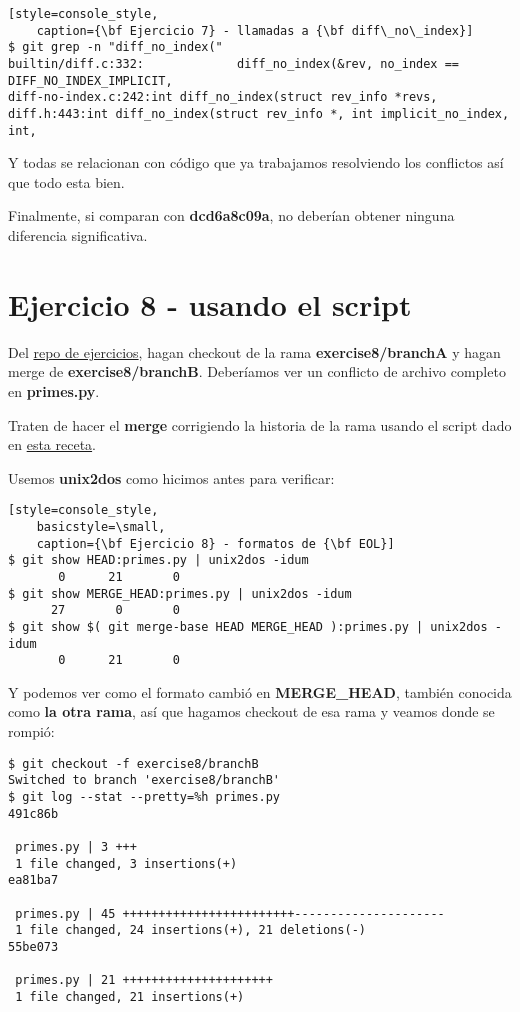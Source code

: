 \begin{lstlisting}[style=console_style,
	caption={\bf Ejercicio 7} - llamadas a {\bf diff\_no\_index}]
$ git grep -n "diff_no_index("
builtin/diff.c:332:             diff_no_index(&rev, no_index == DIFF_NO_INDEX_IMPLICIT, 
diff-no-index.c:242:int diff_no_index(struct rev_info *revs,
diff.h:443:int diff_no_index(struct rev_info *, int implicit_no_index, int,
\end{lstlisting}

Y todas se relacionan con código que ya trabajamos resolviendo los conflictos así que todo esta bien.

Finalmente, si comparan con {\bf dcd6a8c09a}, no deberían obtener ninguna diferencia significativa.

\section{Ejercicio 8 - usando el script}
\label{exercise08}

Del \hyperref[exercises_repo]{repo de ejercicios}, hagan checkout de la rama {\bf exercise8/branchA} y hagan merge de {\bf exercise8/branchB}.
Deberíamos ver un conflicto de archivo completo en {\bf primes.py}.

Traten de hacer el {\bf merge} corrigiendo la historia de la rama usando el script dado en \hyperref[correct_eol_history]{esta receta}.

Usemos {\bf unix2dos} como hicimos antes
para verificar:

\begin{lstlisting}[style=console_style,
	basicstyle=\small,
	caption={\bf Ejercicio 8} - formatos de {\bf EOL}]
$ git show HEAD:primes.py | unix2dos -idum
       0      21       0
$ git show MERGE_HEAD:primes.py | unix2dos -idum
      27       0       0
$ git show $( git merge-base HEAD MERGE_HEAD ):primes.py | unix2dos -idum
       0      21       0
\end{lstlisting}

Y podemos ver como el formato cambió en {\bf MERGE\_HEAD}, también conocida como  {\bf la otra rama}, así que hagamos checkout
de esa rama y veamos donde se rompió:

\begin{lstlisting}[style=console_style,
	basicstyle=\small,
	caption={\bf Ejercicio 8} - averiguando donde se rompió]
$ git checkout -f exercise8/branchB
Switched to branch 'exercise8/branchB'
$ git log --stat --pretty=%h primes.py
491c86b

 primes.py | 3 +++
 1 file changed, 3 insertions(+)
ea81ba7

 primes.py | 45 ++++++++++++++++++++++++---------------------
 1 file changed, 24 insertions(+), 21 deletions(-)
55be073

 primes.py | 21 +++++++++++++++++++++
 1 file changed, 21 insertions(+)
\end{lstlisting}

